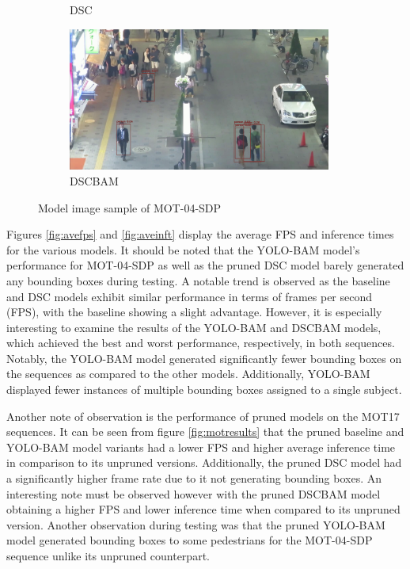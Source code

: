 \begin{figure}[!htbp]
\begin{subfigure}{.25\textwidth}
  \caption{DSC}
  \label{fig:dscMOT-04}
\end{subfigure}%
\begin{subfigure}{.25\textwidth}
  \centering
  \includegraphics[width=0.95\textwidth]{images/DSCBAM_MOT-04.png}
  \caption{DSCBAM}
  \label{fig:dscbamMOT-04}
\end{subfigure}
\caption{Model image sample of MOT-04-SDP}
\label{fig:MOT-04}
\end{figure}


Figures \ref{fig:avefps} and \ref{fig:aveinft} display the average FPS and inference times for the various models. It should be noted that the YOLO-BAM model's performance for MOT-04-SDP as well as the pruned DSC model barely generated any bounding boxes during testing. A notable trend is observed as the baseline and DSC models exhibit similar performance in terms of frames per second (FPS), with the baseline showing a slight advantage. However, it is especially interesting to examine the results of the YOLO-BAM and DSCBAM models, which achieved the best and worst performance, respectively, in both sequences. Notably, the YOLO-BAM model generated significantly fewer bounding boxes on the sequences as compared to the other models. Additionally, YOLO-BAM displayed fewer instances of multiple bounding boxes assigned to a single subject.

Another note of observation is the performance of pruned models on the MOT17 sequences. It can be seen from figure \ref{fig:motresults} that the pruned baseline and YOLO-BAM model variants had a lower FPS and higher average inference time in comparison to its unpruned versions. Additionally, the pruned DSC model had a significantly higher frame rate due to it not generating bounding boxes. An interesting note must be observed however with the pruned DSCBAM model obtaining a higher FPS and lower inference time when compared to its unpruned version. Another observation during testing was that the pruned YOLO-BAM model generated bounding boxes to some pedestrians for the MOT-04-SDP sequence unlike its unpruned counterpart.

